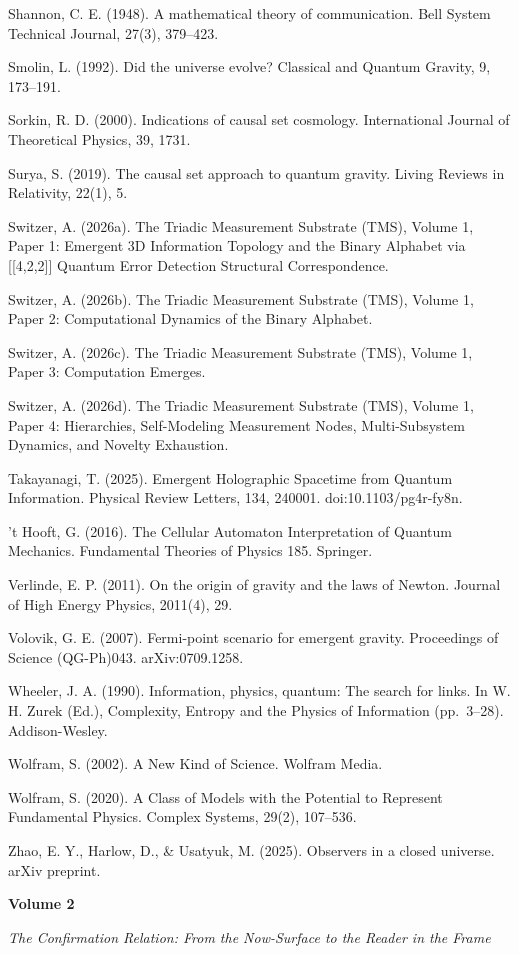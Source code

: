 \documentclass[11pt,oneside]{report}
\theoremstyle{definition}
\theoremstyle{remark}
\newenvironment{reflist}
  {\par\small\setlength{\parindent}{0pt}%
   \setlength{\leftskip}{1.6em}\setlength{\parindent}{-1.6em}%
   \setlength{\parskip}{0.4em}%
   \raggedright\hyphenpenalty=50\exhyphenpenalty=50\relax
   \sloppy}
  {\par}
\begin{document}
\begin{reflist}
Shannon, C. E. (1948). A mathematical theory of communication. Bell
System Technical Journal, 27(3), 379--423.

Smolin, L. (1992). Did the universe evolve? Classical and Quantum
Gravity, 9, 173--191.

Sorkin, R. D. (2000). Indications of causal set cosmology. International
Journal of Theoretical Physics, 39, 1731.

Surya, S. (2019). The causal set approach to quantum gravity. Living
Reviews in Relativity, 22(1), 5.

Switzer, A. (2026a). The Triadic Measurement Substrate (TMS), Volume 1,
Paper 1: Emergent 3D Information Topology and the Binary Alphabet via
[[4,2,2]] Quantum Error Detection Structural Correspondence.

Switzer, A. (2026b). The Triadic Measurement Substrate (TMS), Volume 1,
Paper 2: Computational Dynamics of the Binary Alphabet.

Switzer, A. (2026c). The Triadic Measurement Substrate (TMS), Volume 1,
Paper 3: Computation Emerges.

Switzer, A. (2026d). The Triadic Measurement Substrate (TMS), Volume 1,
Paper 4: Hierarchies, Self-Modeling Measurement Nodes, Multi-Subsystem
Dynamics, and Novelty Exhaustion.

Takayanagi, T. (2025). Emergent Holographic Spacetime from Quantum
Information. Physical Review Letters, 134, 240001.
doi:10.1103/pg4r-fy8n.

't Hooft, G. (2016). The Cellular Automaton Interpretation of Quantum
Mechanics. Fundamental Theories of Physics 185. Springer.

Verlinde, E. P. (2011). On the origin of gravity and the laws of Newton.
Journal of High Energy Physics, 2011(4), 29.

Volovik, G. E. (2007). Fermi-point scenario for emergent gravity.
Proceedings of Science (QG-Ph)043. arXiv:0709.1258.

Wheeler, J. A. (1990). Information, physics, quantum: The search for
links. In W. H. Zurek (Ed.), Complexity, Entropy and the Physics of
Information (pp.~3--28). Addison-Wesley.

Wolfram, S. (2002). A New Kind of Science. Wolfram Media.

Wolfram, S. (2020). A Class of Models with the Potential to Represent
Fundamental Physics. Complex Systems, 29(2), 107--536.

Zhao, E. Y., Harlow, D., \& Usatyuk, M. (2025). Observers in a closed
universe. arXiv preprint.
\end{reflist}

\clearpage

\cleardoublepage
\thispagestyle{empty}
\vspace*{0pt}\vfill
\begin{center}
{\sffamily\bfseries\Huge Volume 2\par}
\vspace{1cm}
{\large\itshape The Confirmation Relation: From the Now-Surface to the Reader in the Frame\par}
\end{center}
\vfill\cleardoublepage
\end{document}
